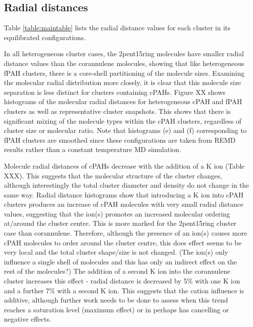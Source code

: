 \subsection{Radial distances}
Table \ref{table:maintable} lists the radial distance values for each cluster in its equilibrated configurations. 


In all heterogeneous cluster cases, the 2pent15ring molecules have smaller radial distance values than the corannulene molecules, showing that like heterogeneous fPAH clusters, there is a core-shell partitioning of the molecule sizes. 
Examining the molecular radial distribution more closely, it is clear that this molecule size separation is less distinct for clusters containing cPAHs. Figure XX shows histograms of the molecular radial distances for heterogeneous cPAH and fPAH clusters as well as representative cluster snapshots. This shows that there is significant mixing of the molecule types within the cPAH clusters, regardless of cluster size or molecular ratio.
Note that histograms (e) and (f) corresponding to fPAH clusters are smoothed since these configurations are taken from REMD results rather than a constant temperature MD simulation.

Molecule radial distances of cPAHs decrease %
with the addition of a K ion (Table XXX). This suggests that the molecular structure of the cluster changes, although interestingly the total cluster diameter and density do not change in the same way. Radial distance histograms show that introducing a K ion into cPAH clusters produces an increase of cPAH molecules with very small radial distance values, suggesting that the ion(s) promotes an increased molecular ordering at/around the cluster centre. This is more marked for the 2pent15ring cluster case than corannulene. Therefore, although the presence of an ion(s) causes more cPAH molecules to order around the cluster centre, this does effect seems to be very local and the total cluster shape/size is not changed.  (The ion(s) only influence a single shell of molecules and this has only an indirect effect on the rest of the molecules?)
The addition of a second K ion into the corannulene cluster increases this effect - radial distance is decreased by 5\% with one K ion and a further 7\% with a second K ion. This suggests that the cation influence is additive, although further work needs to be done to assess when this trend reaches a saturation level (maximum effect) or in perhaps has cancelling or negative effects.


